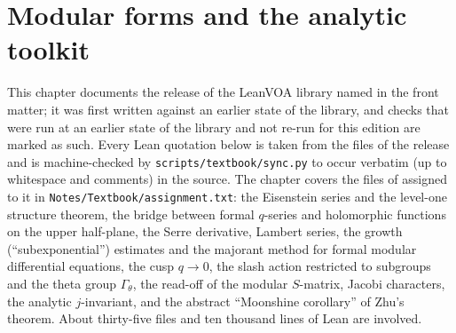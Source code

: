 \chapter{Modular forms and the analytic toolkit}\label{ch:L14}
\begingroup\setlength{\emergencystretch}{3em}

\providecommand{\lfourteenH}{\mathbb{H}}
\providecommand{\lfourteenSL}{\mathrm{SL}_2(\mathbb{Z})}
\providecommand{\lfourteenGt}{\Gamma_\theta}
\providecommand{\lfourteenE}{\mathcal{E}_{46}}
\providecommand{\lfourteenGS}{\mathcal{G}}
\providecommand{\lfourteenev}{\mathrm{ev}}
\providecommand{\lfourteenIm}{\operatorname{Im}}
\providecommand{\lfourteenRe}{\operatorname{Re}}

This chapter documents the release of the LeanVOA library named in the front matter; it was first written against an earlier state of the library, and checks that were
run at an earlier state of the library and not re-run for this edition are marked as such. Every Lean quotation below is taken from the files of the release and is machine-checked by \texttt{scripts/textbook/sync.py} to
occur verbatim (up to whitespace and comments) in the source. The chapter covers the files of
 assigned to it in \texttt{Notes/Textbook/assignment.txt}: the Eisenstein series and the
level-one structure theorem, the bridge between formal $q$-series and holomorphic functions on the upper half-plane, the
Serre derivative, Lambert series, the growth (``subexponential'') estimates and the majorant method for formal modular
differential equations, the cusp $q\to0$, the slash action restricted to subgroups and the theta group $\lfourteenGt$, the
read-off of the modular $S$-matrix, Jacobi characters, the analytic $j$-invariant, and the abstract ``Moonshine corollary''
of Zhu's theorem. About thirty-five files and ten thousand lines of Lean are involved.

